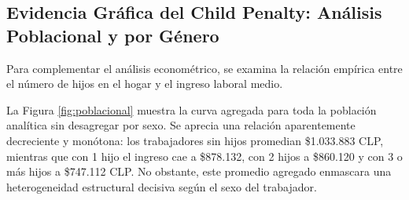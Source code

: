 \documentclass[11pt,a4paper]{article}
\begin{document}
\begin{table}[htbp]
\centering
\caption{Estadísticas Descriptivas CASEN 2024 ($N = 29.781$)}
\label{tab:descriptiva}
\small
{}
\end{table}

\subsection{Evidencia Gráfica del Child Penalty: Análisis Poblacional y por Género}
Para complementar el análisis econométrico, se examina la relación empírica entre el número de hijos en el hogar y el ingreso laboral medio.

La Figura \ref{fig:poblacional} muestra la curva agregada para toda la población analítica sin desagregar por sexo. Se aprecia una relación aparentemente decreciente y monótona: los trabajadores sin hijos promedian \$1.033.883 CLP, mientras que con 1 hijo el ingreso cae a \$878.132, con 2 hijos a \$860.120 y con 3 o más hijos a \$747.112 CLP. No obstante, este promedio agregado enmascara una heterogeneidad estructural decisiva según el sexo del trabajador.
\end{document}

